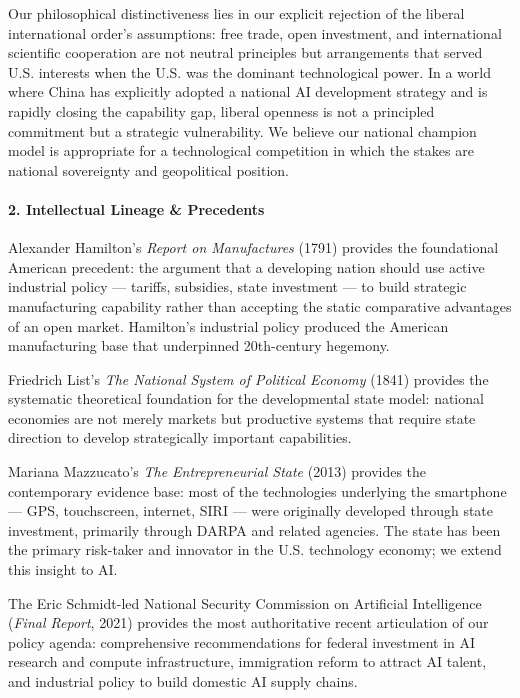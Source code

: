 Our philosophical distinctiveness lies in our explicit rejection of the
liberal international order's assumptions: free trade, open investment,
and international scientific cooperation are not neutral principles but
arrangements that served U.S. interests when the U.S. was the dominant
technological power. In a world where China has explicitly adopted a
national AI development strategy and is rapidly closing the capability
gap, liberal openness is not a principled commitment but a strategic
vulnerability. We believe our national champion model is appropriate for
a technological competition in which the stakes are national sovereignty
and geopolitical position.

\paragraph{2. Intellectual Lineage \&
Precedents}\label{intellectual-lineage-precedents-19}

Alexander Hamilton's \emph{Report on Manufactures} (1791) provides the
foundational American precedent: the argument that a developing nation
should use active industrial policy --- tariffs, subsidies, state
investment --- to build strategic manufacturing capability rather than
accepting the static comparative advantages of an open market.
Hamilton's industrial policy produced the American manufacturing base
that underpinned 20th-century hegemony.

Friedrich List's \emph{The National System of Political Economy} (1841)
provides the systematic theoretical foundation for the developmental
state model: national economies are not merely markets but productive
systems that require state direction to develop strategically important
capabilities.

Mariana Mazzucato's \emph{The Entrepreneurial State} (2013) provides the
contemporary evidence base: most of the technologies underlying the
smartphone --- GPS, touchscreen, internet, SIRI --- were originally
developed through state investment, primarily through DARPA and related
agencies. The state has been the primary risk-taker and innovator in the
U.S. technology economy; we extend this insight to AI.

The Eric Schmidt-led National Security Commission on Artificial
Intelligence (\emph{Final Report}, 2021) provides the most authoritative
recent articulation of our policy agenda: comprehensive recommendations
for federal investment in AI research and compute infrastructure,
immigration reform to attract AI talent, and industrial policy to build
domestic AI supply chains.

